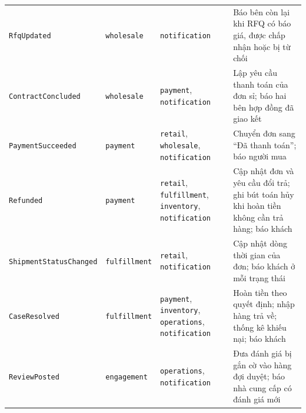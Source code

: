 \begin{longtable}{L{3.55cm} L{2.20cm} L{3.30cm} L{5.10cm}}
\texttt{RfqUpdated} & \texttt{wholesale} & \texttt{notification} & Báo bên còn lại khi RFQ có báo giá, được chấp nhận hoặc bị từ chối \\
\texttt{ContractConcluded} & \texttt{wholesale} & \texttt{payment}, \texttt{notification} & Lập yêu cầu thanh toán của đơn sỉ; báo hai bên hợp đồng đã giao kết \\
\texttt{PaymentSucceeded} & \texttt{payment} & \texttt{retail}, \texttt{wholesale}, \texttt{notification} & Chuyển đơn sang ``Đã thanh toán''; báo người mua \\
\texttt{Refunded} & \texttt{payment} & \texttt{retail}, \texttt{fulfillment}, \texttt{inventory}, \texttt{notification} & Cập nhật đơn và yêu cầu đổi trả; ghi bút toán hủy khi hoàn tiền không cần trả hàng; báo khách \\
\texttt{ShipmentStatusChanged} & \texttt{fulfillment} & \texttt{retail}, \texttt{notification} & Cập nhật dòng thời gian của đơn; báo khách ở mỗi trạng thái \\
\texttt{CaseResolved} & \texttt{fulfillment} & \texttt{payment}, \texttt{inventory}, \texttt{operations}, \texttt{notification} & Hoàn tiền theo quyết định; nhập hàng trả về; thống kê khiếu nại; báo khách \\
\texttt{ReviewPosted} & \texttt{engagement} & \texttt{operations}, \texttt{notification} & Đưa đánh giá bị gắn cờ vào hàng đợi duyệt; báo nhà cung cấp có đánh giá mới \\
\end{longtable}
\endgroup
